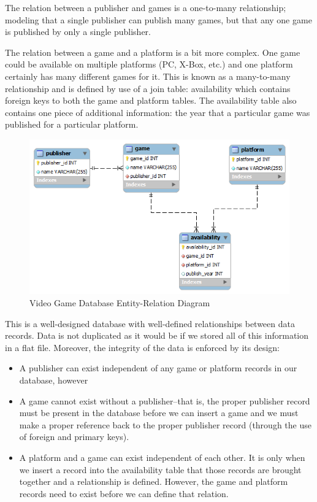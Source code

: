 \documentclass[12pt]{scrartcl}
\begin{document}
The relation between a publisher and games is a one-to-many 
relationship; modeling that a single publisher can publish many 
games, but that any one game is published by only a single 
publisher.

The relation between a game and a platform is a bit more complex.  
One game could be available on multiple platforms (PC, X-Box, etc.) 
and one platform certainly has many different games for it.  This is 
known as a many-to-many relationship and is defined by use of 
a join table: availability which contains foreign keys to both the 
game and platform tables.  The availability table also contains 
one piece of additional information: the year that a particular 
game was published for a particular platform.

\begin{figure}
\centering
\includegraphics[scale=0.75]{videoGameDatabase}
\caption{Video Game Database Entity-Relation Diagram}
\label{figure:videoGameDatabase}
\end{figure}
 
This is a well-designed database with well-defined relationships 
between data records.  Data is not duplicated as it would be if 
we stored all of this information in a flat file.  Moreover, the 
integrity of the data is enforced by its design:
\begin{itemize}
  \item A publisher can exist independent of any game or platform 
  	records in our database, however
  \item A game cannot exist without a publisher--that is, the proper 
	publisher record must be present in the database before we 
	can insert a game and we must make a proper reference back 
	to the proper publisher record (through the use of foreign and 
	primary keys).
  \item A platform and a game can exist independent of each other.  
	It is only when we insert a record into the availability table that 
	those records are brought together and a relationship is defined.  
	However, the game and platform records need to exist before 
	we can define that relation.
\end{itemize}
	
\end{document}
